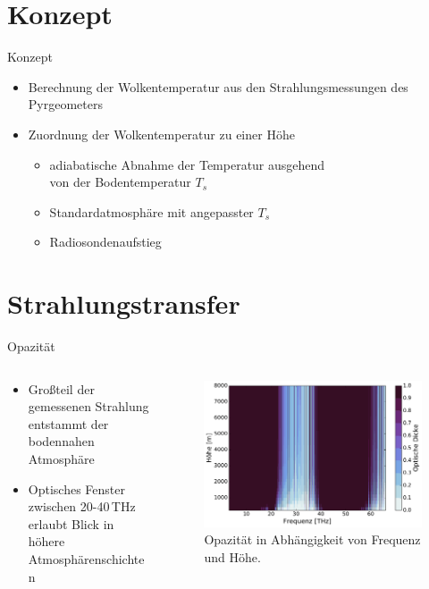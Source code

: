 \documentclass{beamer}
\begin{document}
\section{Konzept}
\begin{frame}{Konzept}
\begin{itemize}
  \vfill\item Berechnung der Wolkentemperatur aus den Strahlungsmessungen des
      Pyrgeometers
  \vfill\item Zuordnung der Wolkentemperatur zu einer Höhe
  \begin{itemize}
    \item adiabatische Abnahme der Temperatur ausgehend\\
          von der Bodentemperatur $T_s$
    \item Standardatmosphäre mit angepasster $T_s$
    \item Radiosondenaufstieg
  \end{itemize}
  \vfill
\end{itemize}
\end{frame}


\section{Strah\-lungs\-trans\-fer}
\begin{frame}{Opazität}
\begin{columns}
\begin{column}{0.45\textwidth}
\begin{itemize}
  \vfill\item Großteil der gemessenen Strahlung entstammt der bodennahen Atmosphäre
  \vfill\item Optisches Fenster zwischen 20-40\,THz erlaubt Blick in höhere
      Atmosphärenschichten
  \vfill
\end{itemize}
\end{column}

\begin{column}{0.55\textwidth}
\begin{figure}[ht]
    \centering
    \includegraphics[width=1\textwidth]{figures/opacity.pdf}
    \caption{Opazität in Abhängigkeit von Frequenz und Höhe.}
    \label{fig:opacity}
\end{figure}
\end{column}
\end{columns}
\end{frame}
\end{document}
